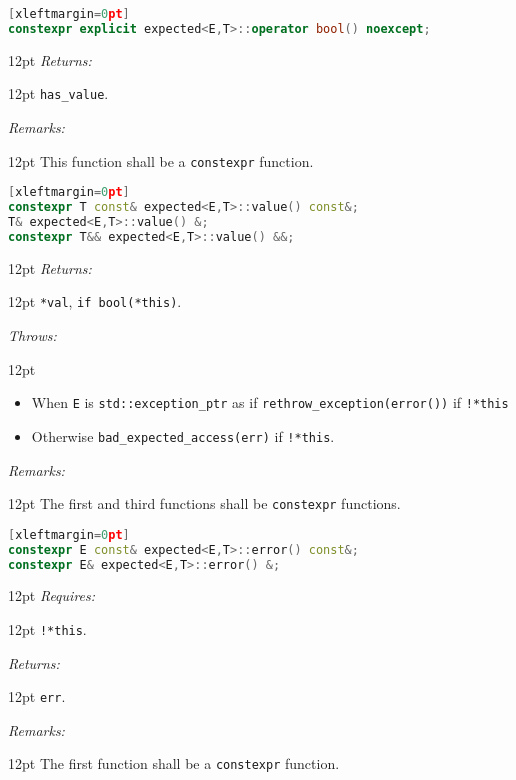 \documentclass[a4paper,10pt]{article}
\newcommand{\cpp}[1]{\lstinline{#1}}
\newcommand{\wordingItem}[1]{\noindent\textit{#1:}}
\newenvironment{wordingTextItem}[1]{\wordingItem{#1}\vspace{2pt}\noindent\begin{adjustwidth}{12pt}{}}{\vspace{2pt}\end{adjustwidth}}
\newenvironment{wordingPara}{\begin{adjustwidth}{12pt}{}}{\end{adjustwidth}}
\begin{document}
\begin{lstlisting}[language=C++][xleftmargin=0pt]
constexpr explicit expected<E,T>::operator bool() noexcept; 
\end{lstlisting}
\begin{wordingPara}
\begin{wordingTextItem}{Returns}
\cpp{has_value}.
\end{wordingTextItem}
\begin{wordingTextItem}{Remarks}
This function shall be a \cpp{constexpr} function.
\end{wordingTextItem}
\end{wordingPara}

\begin{lstlisting}[language=C++][xleftmargin=0pt]
constexpr T const& expected<E,T>::value() const&;
T& expected<E,T>::value() &;
constexpr T&& expected<E,T>::value() &&;
\end{lstlisting}
\begin{wordingPara}
\begin{wordingTextItem}{Returns}
\cpp{*val}, \cpp{if bool(*this)}.
\end{wordingTextItem}
\begin{wordingTextItem}{Throws}
\begin{itemize}
\item When \cpp{E} is \cpp{std::exception_ptr} as if \cpp{rethrow_exception(error())} if \cpp{!*this} 
\item Otherwise \cpp{bad_expected_access(err)} if \cpp{!*this}.
\end{itemize}

\end{wordingTextItem}
\begin{wordingTextItem}{Remarks}
The first and third functions shall be \cpp{constexpr} functions.
\end{wordingTextItem}
\end{wordingPara}

\begin{lstlisting}[language=C++][xleftmargin=0pt]
constexpr E const& expected<E,T>::error() const&;
constexpr E& expected<E,T>::error() &; 
\end{lstlisting}
\begin{wordingPara}
\begin{wordingTextItem}{Requires}
\cpp{!*this}.
\end{wordingTextItem}
\begin{wordingTextItem}{Returns}
\cpp{err}.
\end{wordingTextItem}
\begin{wordingTextItem}{Remarks}
The first function shall be a \cpp{constexpr} function.
\end{wordingTextItem}
\end{wordingPara}
\end{document}

